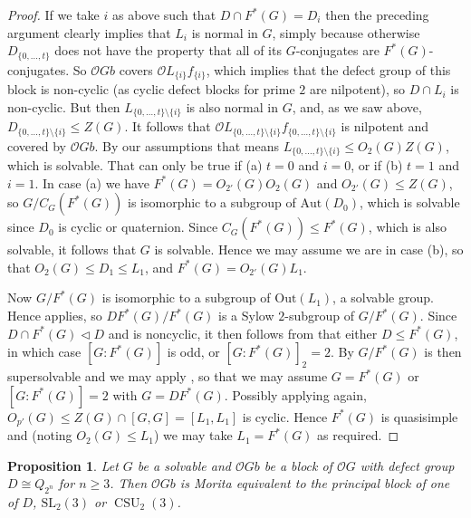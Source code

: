 \documentclass{amsart}
\theoremstyle{plain}\newtheorem{Theorem}{Theorem}[section]
\theoremstyle{plain}\newtheorem{Conjecture}[Theorem]{Conjecture}
\theoremstyle{plain}\newtheorem{Corollary}[Theorem]{Corollary}
\theoremstyle{plain}\newtheorem{Lemma}[Theorem]{Lemma}
\theoremstyle{plain}\newtheorem{Proposition}[Theorem]{Proposition}
\theoremstyle{definition}\newtheorem{Definition}[Theorem]{Definition}
\theoremstyle{definition}\newtheorem{Example}[Theorem]{Example}
\theoremstyle{definition}\newtheorem{Examples}[Theorem]{Examples}
\theoremstyle{definition}\newtheorem{Exercise}[Theorem]{Exercise}
\theoremstyle{definition}\newtheorem{Notation}[Theorem]{Notation}
\theoremstyle{definition}\newtheorem{Remark}[Theorem]{Remark}
\theoremstyle{definition}\newtheorem{Remarks}[Theorem]{Remarks}
\def\CO{{\mathcal{O}}}    \def\OPE{{\mathcal{O}(P\rtimes E)}}
\def\Aut{\mathrm{Aut}}               \def\tenk{\otimes_k}
\def\SL{\mathrm{SL}}
\def\Out{\mathrm{Out}}
\numberwithin{equation}{section}
\begin{document}
\begin{proof}
If we take $i$ as above such that $D\cap F^*(G)=D_i$ then the preceding argument clearly implies that $L_i$ is normal in $G$, simply because otherwise $D_{\{0,\ldots,t\}}$ does not have the property that all of its $G$-conjugates are $F^*(G)$-conjugates. So $\CO G b$ covers $\CO L_{\{i\}}f_{\{i\}}$, which implies that the defect group of this block is non-cyclic (as cyclic defect blocks for prime $2$ are nilpotent), so $D\cap L_i$ is non-cyclic. But then  $L_{\{0,\ldots,t\}\setminus \{i\}}$ is also normal in $G$, and, as we saw above, $D_{\{0,\ldots,t\}\setminus \{i\}}\leq Z(G)$. It follows that $\CO L_{\{0,\ldots,t\}\setminus \{i\}} f_{\{0,\ldots,t\}\setminus \{i\}}$ is nilpotent and covered by $\CO Gb$. By our assumptions that means $L_{\{0,\ldots,t\}\setminus \{i\}} \leq O_2(G)Z(G)$, which is solvable. That can only be true if (a) $t=0$ and $i=0$, or if (b) $t=1$ and $i=1$. In case (a) we have $F^*(G)=O_{2'}(G)O_2(G)$ and $O_{2'}(G)\leq Z(G)$, so $G/C_G(F^*(G))$ is isomorphic to a subgroup of $\Aut(D_0)$, which is solvable since $D_0$ is cyclic or quaternion. Since $C_G(F^*(G))\leq F^*(G)$, which is also solvable, it follows that $G$ is solvable. Hence we may assume we are in case (b), so that $O_2(G)\leq D_1\leq L_1$, and $F^*(G)=O_{2'}(G)L_1$. 

Now $G/F^*(G)$ is isomorphic to a subgroup of $\Out(L_1)$, a solvable group. Hence  applies, so $DF^*(G)/F^*(G)$ is a Sylow $2$-subgroup of $G/F^*(G)$. Since $D \cap F^*(G) \lhd D$ and is noncyclic, it then follows from  that either $D \leq F^*(G)$, in which case $[G:F^*(G)]$ is odd, or $[G:F^*(G)]_2=2$. By  $G/F^*(G)$ is then supersolvable and we may apply , so that we may assume $G=F^*(G)$ or $[G:F^*(G)]=2$ with $G=DF^*(G)$. Possibly applying  again, $O_{p'}(G) \leq Z(G) \cap [G,G]=[L_1,L_1]$ is cyclic. Hence $F^*(G)$ is quasisimple and (noting $O_2(G) \leq L_1$) we may take $L_1=F^*(G)$ as required.
\end{proof}

\begin{Proposition}
Let $G$ be a solvable and $\CO G b$ be a block of $\CO G$ with defect group $D \cong Q_{2^n}$ for $n \geq 3$. Then $\CO Gb$ is Morita equivalent to the principal block of one of $D$, $\SL_2(3)$ or $\operatorname{CSU}_2(3)$. 
\end{Proposition}
\end{document}
